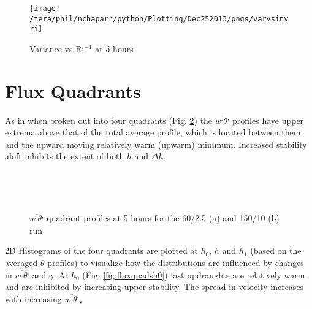 \begin{figure}[htbp]
    \centering
    \texttt{[image: /tera/phil/nchaparr/python/Plotting/Dec252013/pngs/varvsinvri]}
    \caption{Variance vs \acs{Ri}$^{-1}$ at 5 hours}
    \label{fig:varsvsinvri}   %
\end{figure}

\clearpage

\section{Flux Quadrants}
\label{sec:fluxquadrants}     
\FloatBarrier

As in \cite{SullMoengStev} when broken out into four quadrants (Fig. \ref{fig:fluxqadprofs}) the $\overline{w^{,}\theta^{,}}$ profiles have upper extrema above that of the
total average profile, which is located between them and the upward moving relatively warm (upwarm) minimum.  Increased stability aloft inhibits the extent of both 
$h$ and $\Delta h$.\\  

\begin{figure}[htbp]
\begin{minipage}[b]{0.5\linewidth}
        \\
        \end{minipage}             
\quad
\begin{minipage}[b]{0.5\linewidth}
        \\
       \end{minipage}
        \caption{$\overline{w^{,} \theta^{,}}$ quadrant profiles at 5 hours for the 60/2.5 (a) and 150/10 (b) run}
        \label{fig:fluxqadprofs}
\end{figure}

2D Histograms of the four quadrants are plotted at $h_{0}$, $h$ and $h_{1}$ (based on the averaged $\theta$ profiles)
to visualize how the distributions are influenced by changes in $\overline{w^{,} \theta^{,}}$ and $\gamma$.  At $h_{0}$
(Fig. \ref{fig:fluxquadsh0}) fast updraughts are relatively warm and are inhibited by increasing upper stability.  The spread
in velocity increases with increasing $\overline{w^{,}\theta^{,}}_{s}$\\
  

